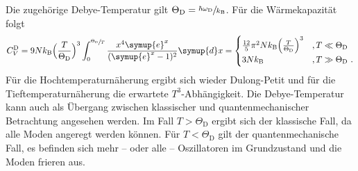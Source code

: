     Die zugehörige Debye-Temperatur gilt $\Theta_\text{D} = \sfrac{\hbar\omega_\text{D}}{k_\text{B}}$.
    Für die Wärmekapazität folgt
    \begin{equation*}
        C^\text{D}_V = 9Nk_\text{B} \Bigl(\frac{T}{\Theta_\text{D}}\Bigr) ^3
        \int_0^{\sfrac{\Theta_\text{D}}{T}} \frac{x^4 \symup{e}^x}{(\symup{e}^x - 1)^2} \symup{d}x =
        \begin{cases}
            \frac{12}{5} \pi^2 N k_\text{B} \Bigl(\frac{T}{\Theta_\text{D}}\Bigr)^3 & , T \ll \Theta_\text{D} \\
            3Nk_\text{B} & , T \gg \Theta_\text{D} \ .
        \end{cases}
    \end{equation*}
    Für die Hochtemperaturnäherung ergibt sich wieder Dulong-Petit und für die Tieftemperaturnäherung die erwartete $T^3$-Abhängigkeit.
    Die Debye-Temperatur kann auch als Übergang zwischen klassischer und quantenmechanischer Betrachtung angesehen werden.
    Im Fall $T > \Theta_\text{D}$ ergibt sich der klassische Fall,
    da alle Moden angeregt werden können.
    Für $T < \Theta_\text{D}$ gilt der quantenmechanische Fall,
    es befinden sich mehr – oder alle – Oszillatoren im Grundzustand und die Moden frieren aus.

